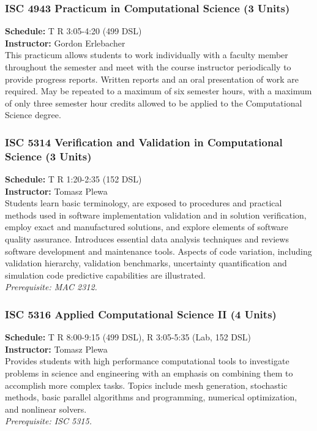 \documentclass[12pt,a4paper]{article}
\begin{document}
\subsubsection*{ISC 4943 Practicum in Computational Science (3 Units)}
\textbf{Schedule:} T R 3:05-4:20 (499 DSL) \\
\textbf{Instructor:} Gordon Erlebacher \\
This practicum allows students to work individually with a faculty member throughout the semester and meet with the course instructor periodically to provide progress reports. Written reports and an oral presentation of work are required. May be repeated to a maximum of six semester hours, with a maximum of only three semester hour credits allowed to be applied to the Computational Science degree.

\subsubsection*{ISC 5314 Verification and Validation in Computational Science (3 Units)}
\textbf{Schedule:} T R 1:20-2:35 (152 DSL) \\
\textbf{Instructor:} Tomasz Plewa \\
Students learn basic terminology, are exposed to procedures and practical methods used in software implementation validation and in solution verification, employ exact and manufactured solutions, and explore elements of software quality assurance. Introduces essential data analysis techniques and reviews software development and maintenance tools. Aspects of code variation, including validation hierarchy, validation benchmarks, uncertainty quantification and simulation code predictive capabilities are illustrated. \\
\textit{Prerequisite: MAC 2312.}

\subsubsection*{ISC 5316 Applied Computational Science II (4 Units)}
\textbf{Schedule:} T R 8:00-9:15 (499 DSL), R 3:05-5:35 (Lab, 152 DSL) \\
\textbf{Instructor:} Tomasz Plewa \\
Provides students with high performance computational tools to investigate problems in science and engineering with an emphasis on combining them to accomplish more complex tasks. Topics include mesh generation, stochastic methods, basic parallel algorithms and programming, numerical optimization, and nonlinear solvers. \\
\textit{Prerequisite: ISC 5315.}
\end{document}
